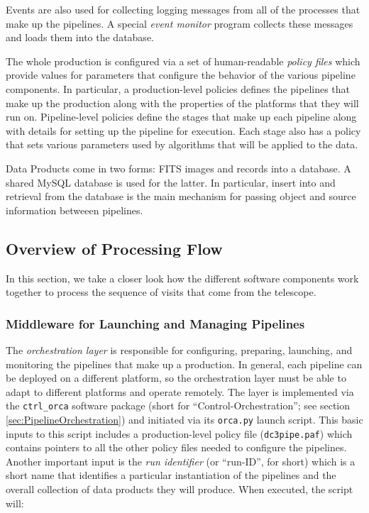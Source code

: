 Events are also used for collecting logging messages from all of the
processes that make up the pipelines.  A special \textit{event
monitor} program collects these messages and loads them into the
database.  

The whole production is configured via a set of human-readable
\textit{policy files} which provide values for parameters that
configure the behavior of the various pipeline components.  In
particular, a production-level policies defines the pipelines that
make up the production along with the properties of the platforms that
they will run on.  Pipeline-level policies define the stages that make
up each pipeline along with details for setting up the pipeline for
execution.  Each stage also has a policy that sets various parameters
used by algorithms that will be applied to the data.  

Data Products come in two forms: FITS images and records into a
database.  A shared MySQL database is used for the latter.  In
particular, insert into and retrieval from the database is the main
mechanism for passing object and source information betweeen
pipelines.  

\subsection{Overview of Processing Flow}

In this section, we take a closer look how the different software
components work together to process the sequence of visits that come
from the telescope.  

\subsubsection{Middleware for Launching and Managing Pipelines} 
\label{sec:orcaintro}

The \textit{orchestration layer} is responsible for configuring,
preparing, launching, and monitoring the pipelines that make up a
production.  In general, each pipeline can be deployed on a different
platform, so the orchestration layer must be able to adapt to
different platforms and operate remotely.  The layer is implemented
via the \texttt{ctrl\_orca} software package (short for
``Control-Orchestration''; see section \ref{sec:PipelineOrchestration})
and initiated via its \texttt{orca.py} launch script.  This basic
inputs to this script includes a production-level policy file
(\texttt{dc3pipe.paf}) which contains pointers to all the other policy
files needed to configure the pipelines.  Another important input is
the \textit{run identifier} (or ``run-ID'', for short) which is a
short name that identifies a particular instantiation of the pipelines
and the overall collection of data products they will produce.  When
executed, the script will:  

